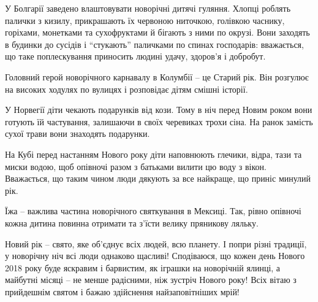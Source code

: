 У Болгарії заведено влаштовувати новорічні дитячі гуляння. Хлопці роблять
палички з кизилу, прикрашають їх червоною ниточкою, голівкою часнику, горіхами,
монетками та сухофруктами й бігають з ними по окрузі. Вони заходять в будинки
до сусідів і \enquote{стукають} паличками по спинах господарів: вважається, що таке
поплескування приносить людині удачу, здоров'я і добробут.

Головний герой новорічного карнавалу в Колумбії – це Старий рік. Він розгулює
на високих ходулях по вулицях і розповідає дітям смішні історії.

У Норвегії діти чекають подарунків від кози. Тому в ніч перед Новим роком вони
готують їй частування, залишаючи в своїх черевиках трохи сіна. На ранок замість
сухої трави вони знаходять подарунки.

На Кубі перед настанням Нового року діти наповнюють глечики, відра, тази та
миски водою, щоб опівночі разом з батьками вилити цю воду з вікон. Вважається,
що таким чином люди дякують за все найкраще, що приніс минулий рік.

Їжа – важлива частина новорічного святкування в Мексиці. Так, рівно опівночі
кожна дитина повинна отримати та з'їсти велику пряникову ляльку.

Новий рік – свято, яке об'єднує всіх людей, всю планету. І попри різні
традиції,  у новорічну ніч всі люди однаково щасливі! Сподіваюся, що кожен день
Нового 2018 року буде яскравим і барвистим, як іграшки на новорічній ялинці, а
майбутні місяці – не менше радісними, ніж зустріч Нового року! Всіх вітаю з
прийдешнім святом і бажаю здійснення найзаповітніших мрій!

\clearpage

